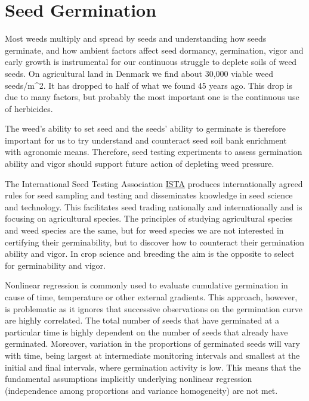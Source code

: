 \documentclass[letterpaper,]{book}
\begin{document}
\hypertarget{seed-germination}{%
\chapter{Seed Germination}\label{seed-germination}}

Most weeds multiply and spread by seeds and understanding how seeds germinate, and how ambient factors affect seed dormancy, germination, vigor and early growth is instrumental for our continuous struggle to deplete soils of weed seeds. On agricultural land in Denmark we find about 30,000 viable weed seeds/m\^{}2. It has dropped to half of what we found 45 years ago. This drop is due to many factors, but probably the most important one is the continuous use of herbicides.

The weed's ability to set seed and the seeds' ability to germinate is therefore important for us to try understand and counteract seed soil bank enrichment with agronomic means. Therefore, seed testing experiments to assess germination ability and vigor should support future action of depleting weed pressure.

The International Seed Testing Association \href{https://www.seedtest.org/en/home.html}{ISTA} produces internationally agreed rules for seed sampling and testing and disseminates knowledge in seed science and technology. This facilitates seed trading nationally and internationally and is focusing on agricultural species. The principles of studying agricultural species and weed species are the same, but for weed species we are not interested in certifying their germinability, but to discover how to counteract their germination ability and vigor. In crop science and breeding the aim is the opposite to select for germinability and vigor.

Nonlinear regression is commonly used to evaluate cumulative germination in cause of time, temperature or other external gradients. This approach, however, is problematic as it ignores that successive observations on the germination curve are highly correlated. The total number of seeds that have germinated at a particular time is highly dependent on the number of seeds that already have germinated. Moreover, variation in the proportions of germinated seeds will vary with time, being largest at intermediate monitoring intervals and smallest at the initial and final intervals, where germination activity is low. This means that the fundamental assumptions implicitly underlying nonlinear regression (independence among proportions and variance homogeneity) are not met.
\end{document}
